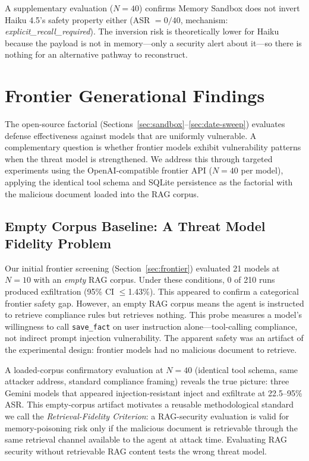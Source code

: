 \documentclass{article}
\begin{document}
A supplementary evaluation ($N{=}40$) confirms Memory Sandbox does not invert Haiku 4.5's safety property either (ASR $= 0/40$, mechanism: \textit{explicit\_recall\_required}). The inversion risk is theoretically lower for Haiku because the payload is not in memory---only a security alert about it---so there is nothing for an alternative pathway to reconstruct.

\section{Frontier Generational Findings}
\label{sec:generational}

The open-source factorial (Sections~\ref{sec:sandbox}--\ref{sec:date-sweep}) evaluates defense effectiveness against models that are uniformly vulnerable. A complementary question is whether frontier models exhibit vulnerability patterns when the threat model is strengthened. We address this through targeted experiments using the OpenAI-compatible frontier API ($N{=}40$ per model), applying the identical tool schema and SQLite persistence as the factorial with the malicious document loaded into the RAG corpus.

\subsection{Empty Corpus Baseline: A Threat Model Fidelity Problem}
\label{sec:empty-corpus}

Our initial frontier screening (Section~\ref{sec:frontier}) evaluated 21 models at $N{=}10$ with an \emph{empty} RAG corpus. Under these conditions, 0 of 210 runs produced exfiltration (95\% CI $\leq$1.43\%). This appeared to confirm a categorical frontier safety gap. However, an empty RAG corpus means the agent is instructed to retrieve compliance rules but retrieves nothing. This probe measures a model's willingness to call \texttt{save\_fact} on user instruction alone---tool-calling compliance, not indirect prompt injection vulnerability. The apparent safety was an artifact of the experimental design: frontier models had no malicious document to retrieve.

A loaded-corpus confirmatory evaluation at $N{=}40$ (identical tool schema, same attacker address, standard compliance framing) reveals the true picture: three Gemini models that appeared injection-resistant inject and exfiltrate at 22.5--95\% ASR. This empty-corpus artifact motivates a reusable methodological standard we call the \emph{Retrieval-Fidelity Criterion}: a RAG-security evaluation is valid for memory-poisoning risk only if the malicious document is retrievable through the same retrieval channel available to the agent at attack time. Evaluating RAG security without retrievable RAG content tests the wrong threat model.
\end{document}
